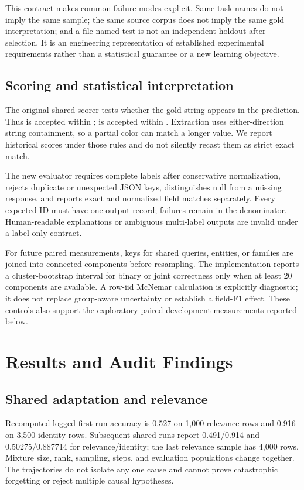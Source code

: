 This contract makes common failure modes explicit. Same task names do not imply the same sample; the same source corpus does not imply the same gold interpretation; and a file named test is not an independent holdout after selection. It is an engineering representation of established experimental requirements rather than a statistical guarantee or a new learning objective.

\subsection{Scoring and statistical interpretation}
The original shared scorer tests whether the gold string appears in the prediction. Thus  is accepted within ;  is accepted within . Extraction uses either-direction string containment, so a partial color can match a longer value. We report historical scores under those rules and do not silently recast them as strict exact match.

The new evaluator requires complete labels after conservative normalization, rejects duplicate or unexpected JSON keys, distinguishes null from a missing response, and reports exact and normalized field matches separately. Every expected ID must have one output record; failures remain in the denominator. Human-readable explanations or ambiguous multi-label outputs are invalid under a label-only contract.

For future paired measurements, keys for shared queries, entities, or families are joined into connected components before resampling. The implementation reports a cluster-bootstrap interval for binary or joint correctness only when at least 20 components are available. A row-iid McNemar calculation is explicitly diagnostic; it does not replace group-aware uncertainty or establish a field-F1 effect. These controls also support the exploratory paired development measurements reported below.

\section{Results and Audit Findings}
\subsection{Shared adaptation and relevance}
Recomputed logged first-run accuracy is 0.527 on 1,000 relevance rows and 0.916 on 3,500 identity rows. Subsequent shared runs report 0.491/0.914 and 0.50275/0.887714 for relevance/identity; the last relevance sample has 4,000 rows. Mixture size, rank, sampling, steps, and evaluation populations change together. The trajectories do not isolate any one cause and cannot prove catastrophic forgetting or reject multiple causal hypotheses.

